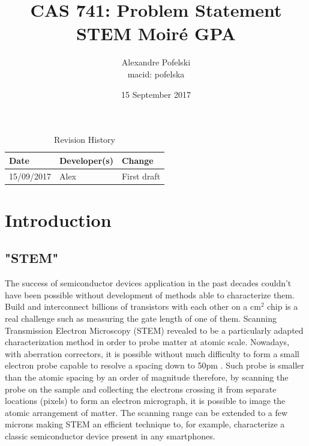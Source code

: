 \documentclass{article}
\title{CAS 741: Problem Statement\\STEM Moir{\'e} GPA}
\author{Alexandre Pofelski \\
macid: pofelska}
\date{15 September 2017}
\begin{document}
\maketitle
\clearpage

\begin{table}[hp]
\caption{Revision History} \label{TblRevisionHistory}
\begin{tabularx}{\textwidth}{llX}
\toprule
\textbf{Date} & \textbf{Developer(s)} & \textbf{Change}\\
\midrule
15/09/2017 & Alex & First draft\\
\bottomrule
\end{tabularx}
\end{table}

\clearpage
\tableofcontents
\clearpage

\section{Introduction}
\subsection{"STEM"}
The success of semiconductor devices application in the past decades couldn't have been possible without development of methods able to characterize them. Build and interconnect billions of transistors with each other on a cm$^{2}$ chip is a real challenge such as measuring the gate length of one of them. Scanning Transmission Electron Microscopy (STEM) revealed to be a particularly adapted characterization method in order to probe matter at atomic scale. Nowadays, with aberration correctors, it is possible without much difficulty to form a small electron probe capable to resolve a spacing down to 50pm \cite{Erni2009}. Such probe is smaller than the atomic spacing by an order of magnitude therefore, by scanning the probe on the sample and collecting the electrons crossing it from separate locations (pixels) to form an electron micrograph, it is possible to image the atomic arrangement of matter. The scanning range can be extended to a few microns making STEM an efficient technique to, for example, characterize a classic semiconductor device present in any smartphones.
\end{document}
